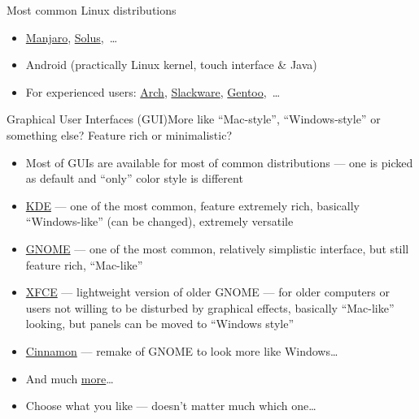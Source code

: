 \documentclass[compress, xelatex, 11pt, xcolor=svgnames, aspectratio=169, url={hyphens, lowtilde}]{beamer}
\begin{document}
\begin{frame}{Most common Linux distributions}
\begin{itemize}
\begin{itemize}
			\item \href{https://www.opensuse.org/}{openSUSE} --- SUSE is second largest Linux company, openSUSE is community distribution (free) companion of SUSE Linux Enterprise
			\item \href{https://www.mageia.org/}{Mageia}, \href{https://www.pclinuxos.com/}{PCLinuxOS},~\ldots
		\end{itemize}
		\item \href{https://manjaro.org/}{Manjaro}, \href{https://getsol.us/}{Solus},~\ldots
		\item Android (practically Linux kernel, touch interface \& Java)
		\item For experienced users: \href{https://archlinux.org/}{Arch}, \href{http://www.slackware.com/}{Slackware}, \href{https://www.gentoo.org/}{Gentoo},~\ldots
	\end{itemize}
\end{frame}

\begin{frame}{Graphical User Interfaces (GUI)}{More like \enquote{Mac-style}, \enquote{Windows-style} or something else? Feature rich or minimalistic?}
	\begin{itemize}
		\item Most of GUIs are available for most of common distributions --- one is picked as default and \enquote{only} color style is different
		\item \href{https://kde.org/}{KDE} --- one of the most common, feature extremely rich, basically \enquote{Windows-like} (can be changed), extremely versatile
		\item \href{https://www.gnome.org/}{GNOME} --- one of the most common, relatively simplistic interface, but still feature rich, \enquote{Mac-like}
		\item \href{https://xfce.org/}{XFCE} --- lightweight version of older GNOME --- for older computers or users not willing to be disturbed by graphical effects, basically \enquote{Mac-like} looking, but panels can be moved to \enquote{Windows style}
		\item \href{https://cinnamon-spices.linuxmint.com/}{Cinnamon} --- remake of GNOME to look more like Windows\ldots
		\item And much \href{https://en.wikipedia.org/wiki/Desktop_environment\#Examples_of_desktop_environments}{more}\ldots
		\item Choose what you like --- doesn't matter much which one\ldots
	\end{itemize}
\end{frame}
\end{document}
